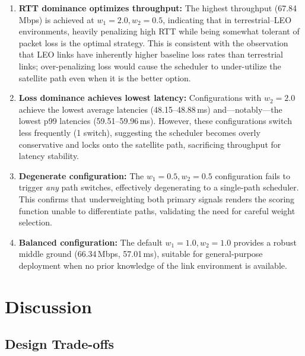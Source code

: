 \documentclass[conference,10pt]{IEEEtran}
\begin{document}
\begin{enumerate}
    \item \textbf{RTT dominance optimizes throughput:} The highest throughput (67.84\,Mbps) is achieved at $w_1 = 2.0, w_2 = 0.5$, indicating that in terrestrial--LEO environments, heavily penalizing high RTT while being somewhat tolerant of packet loss is the optimal strategy.
    This is consistent with the observation that LEO links have inherently higher baseline loss rates than terrestrial links; over-penalizing loss would cause the scheduler to under-utilize the satellite path even when it is the better option.

    \item \textbf{Loss dominance achieves lowest latency:} Configurations with $w_2 = 2.0$ achieve the lowest average latencies (48.15--48.88\,ms) and—notably—the lowest p99 latencies (59.51--59.96\,ms).
    However, these configurations switch less frequently (1 switch), suggesting the scheduler becomes overly conservative and locks onto the satellite path, sacrificing throughput for latency stability.

    \item \textbf{Degenerate configuration:} The $w_1 = 0.5, w_2 = 0.5$ configuration fails to trigger \emph{any} path switches, effectively degenerating to a single-path scheduler.
    This confirms that underweighting both primary signals renders the scoring function unable to differentiate paths, validating the need for careful weight selection.

    \item \textbf{Balanced configuration:} The default $w_1 = 1.0, w_2 = 1.0$ provides a robust middle ground (66.34\,Mbps, 57.01\,ms), suitable for general-purpose deployment when no prior knowledge of the link environment is available.
\end{enumerate}

\section{Discussion}
\label{sec:discussion}

\subsection{Design Trade-offs}
\end{document}
